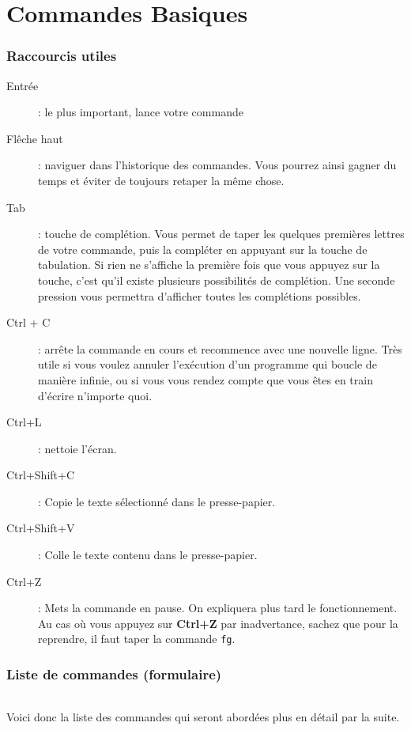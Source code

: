 \part{Commandes Basiques}

\section{Raccourcis utiles}

\begin{description}
	\item[Entrée]: le plus important, lance votre commande
	\item[Flêche haut]: naviguer dans l'historique des commandes. Vous pourrez
		ainsi gagner du temps et éviter de toujours retaper la même chose.
	\item[Tab]: touche de complétion. Vous permet de taper les quelques
		premières lettres de votre commande, puis la compléter en appuyant sur
		la touche de tabulation. Si rien ne s'affiche la première fois que vous
		appuyez sur la touche, c'est qu'il existe plusieurs possibilités de
		complétion. Une seconde pression vous permettra d'afficher toutes les
		complétions possibles.
	\item[Ctrl + C]: arrête la commande en cours et recommence avec une
		nouvelle ligne. Très utile si vous voulez annuler l'exécution d'un
		programme qui boucle de manière infinie, ou si vous vous rendez compte
		que vous êtes en train d'écrire n'importe quoi.
	\item[Ctrl+L]: nettoie l'écran.
	\item[Ctrl+Shift+C]: Copie le texte sélectionné dans le presse-papier.
	\item[Ctrl+Shift+V]: Colle le texte contenu dans le presse-papier.
	\item[Ctrl+Z]: Mets la commande en pause. On expliquera plus tard le
		fonctionnement. Au cas où vous appuyez sur \textbf{Ctrl+Z} par
		inadvertance, sachez que pour la reprendre, il faut taper la commande
		\texttt{fg}.
\end{description}

\section{Liste de commandes (formulaire)}

\paragraph{} Voici donc la liste des commandes qui seront abordées plus en
détail par la suite.


